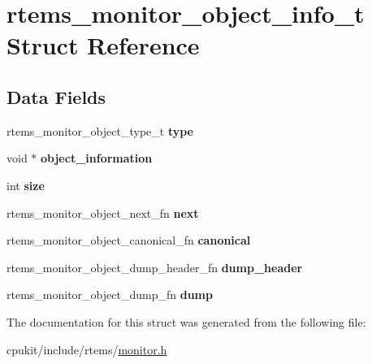 \hypertarget{structrtems__monitor__object__info__t}{}\section{rtems\+\_\+monitor\+\_\+object\+\_\+info\+\_\+t Struct Reference}
\label{structrtems__monitor__object__info__t}
\subsection*{Data Fields}
\begin{DoxyCompactItemize}
\item 
\mbox{\label{structrtems__monitor__object__info__t_a14545980570aba35dabdde5ad3b9abf6}} 
rtems\+\_\+monitor\+\_\+object\+\_\+type\+\_\+t {\bfseries type}
\item 
\mbox{\label{structrtems__monitor__object__info__t_ae664f90388b6bae8c252cf55e2f54d17}} 
void $\ast$ {\bfseries object\+\_\+information}
\item 
\mbox{\label{structrtems__monitor__object__info__t_a44924954bcddc534a1faf6c52ee27d5a}} 
int {\bfseries size}
\item 
\mbox{\label{structrtems__monitor__object__info__t_a0adab7292b6489563355b1b0d730964f}} 
rtems\+\_\+monitor\+\_\+object\+\_\+next\+\_\+fn {\bfseries next}
\item 
\mbox{\label{structrtems__monitor__object__info__t_a28ca683b72c398c10d28e5731e08e393}} 
rtems\+\_\+monitor\+\_\+object\+\_\+canonical\+\_\+fn {\bfseries canonical}
\item 
\mbox{\label{structrtems__monitor__object__info__t_a00ac9e358c398e6176e872fb8a36aed7}} 
rtems\+\_\+monitor\+\_\+object\+\_\+dump\+\_\+header\+\_\+fn {\bfseries dump\+\_\+header}
\item 
\mbox{\label{structrtems__monitor__object__info__t_a5e5166fc04cd2e09201bb0c51778318e}} 
rtems\+\_\+monitor\+\_\+object\+\_\+dump\+\_\+fn {\bfseries dump}
\end{DoxyCompactItemize}


The documentation for this struct was generated from the following file\+:\begin{DoxyCompactItemize}
\item 
cpukit/include/rtems/\mbox{\hyperlink{monitor_8h}{monitor.\+h}}\end{DoxyCompactItemize}
